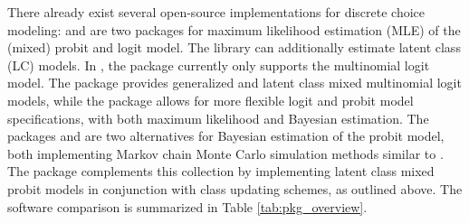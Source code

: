 \documentclass[article,shortnames]{jss}
\begin{document}
There already exist several open-source implementations for discrete choice modeling:  \citep{Sarrias:2016} and  \citep{Croissant:2020} are two  packages for maximum likelihood estimation (MLE) of the (mixed) probit and logit model. The  \citep{Python} library  \citep{Bierlaire:2020} can additionally estimate latent class (LC) models. In  \citep{Julia}, the  package \citep{Bhagat:2022} currently only supports the multinomial logit model. The  package  \citep{Sarrias:2017} provides generalized and latent class mixed multinomial logit models, while the  package \citep{Hess:2019} allows for more flexible logit and probit model specifications, with both maximum likelihood and Bayesian estimation. The  packages  \citep{Rossi:2019} and  \citep{Imai:2022} are two alternatives for Bayesian estimation of the probit model, both implementing Markov chain Monte Carlo simulation methods similar to . The  package complements this collection by implementing latent class mixed probit models in conjunction with class updating schemes, as outlined above. The software comparison is summarized in Table \ref{tab:pkg_overview}.
\end{document}
